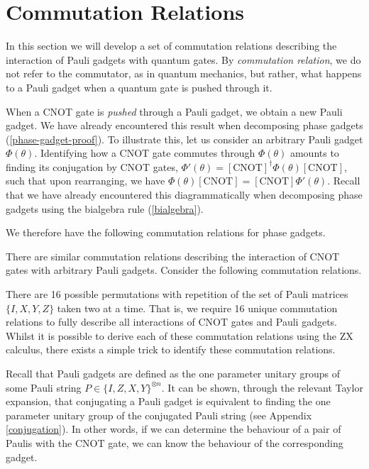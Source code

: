 \section{Commutation Relations}

In this section we will develop a set of commutation relations describing the interaction of Pauli gadgets with quantum gates. By \textit{commutation relation}, we do not refer to the commutator, as in quantum mechanics, but rather, what happens to a Pauli gadget when a quantum gate is pushed through it.

When a CNOT gate is \textit{pushed} through a Pauli gadget, we obtain a new Pauli gadget. We have already encountered this result when decomposing phase gadgets (\ref{phase-gadget-proof}). To illustrate this, let us consider an arbitrary Pauli gadget $\Phi(\theta)$. Identifying how a CNOT gate commutes through $\Phi(\theta)$ amounts to finding its conjugation by CNOT gates, $\Phi'(\theta) = \left[\text{CNOT} \right]^\dagger \Phi(\theta) \left[\text{CNOT} \right]$, such that upon rearranging, we have $\Phi(\theta) \left[\text{CNOT} \right] = \left[\text{CNOT} \right] \Phi'(\theta)$. Recall that we have already encountered this diagrammatically when decomposing phase gadgets using the bialgebra rule (\ref{bialgebra}).


We therefore have the following commutation relations for phase gadgets.


There are similar commutation relations describing the interaction of CNOT gates with arbitrary Pauli gadgets. Consider the following commutation relations.


There are 16 possible permutations with repetition of the set of Pauli matrices $\{I, X, Y, Z\}$ taken two at a time. That is, we require 16 unique commutation relations to fully describe all interactions of CNOT gates and Pauli gadgets. Whilst it is possible to derive each of these commutation relations using the ZX calculus, there exists a simple trick to identify these commutation relations.

Recall that Pauli gadgets are defined as the one parameter unitary groups of some Pauli string $P \in \{I, Z, X, Y\}^{\otimes n}$. It can be shown, through the relevant Taylor expansion, that conjugating a Pauli gadget is equivalent to finding the one parameter unitary group of the conjugated Pauli string (see Appendix \ref{conjugation}). In other words, if we can determine the behaviour of a pair of Paulis with the CNOT gate, we can know the behaviour of the corresponding gadget.

